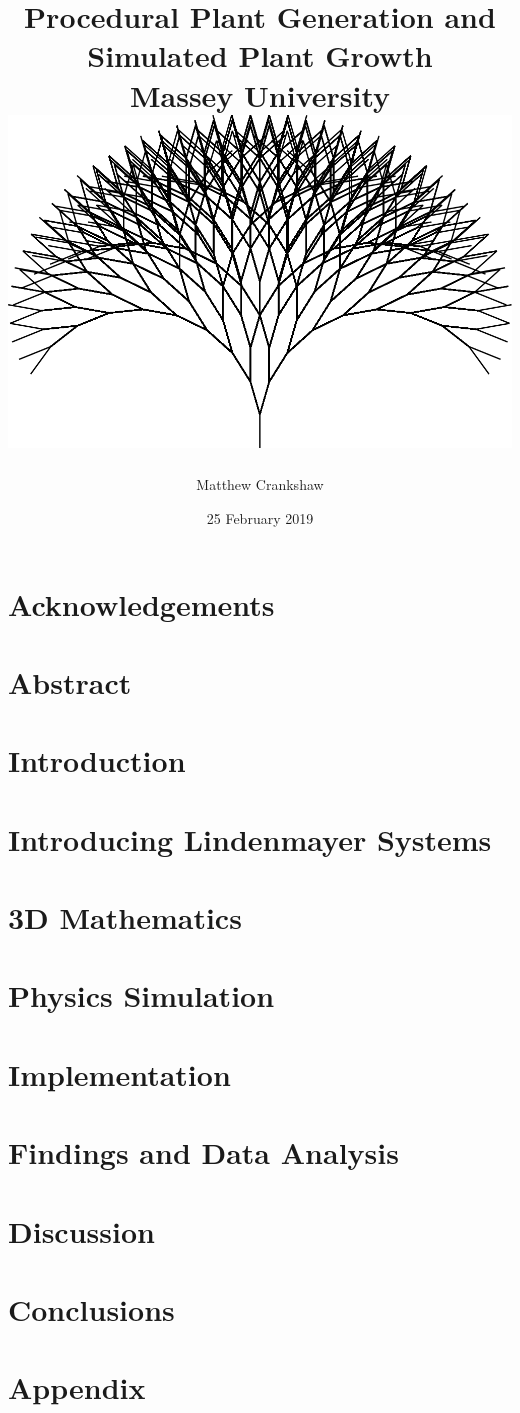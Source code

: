 \documentclass[11pt]{report}
\title{
{ Procedural Plant Generation and Simulated Plant Growth }\\
{\large Massey University}
\\
\vspace{2cm}
{\includegraphics[scale=0.35]{titlepage.png}}
\vspace{2cm}
}
\author{Matthew Crankshaw}
\date{25 February 2019}
\begin{document}
\maketitle

\chapter*{Acknowledgements}

\chapter*{Abstract}

\tableofcontents
\listoffigures


\chapter{Introduction}


\chapter{Introducing Lindenmayer Systems}   


\chapter{3D Mathematics}


\chapter{Physics Simulation}


\chapter{Implementation}


\chapter{Findings and Data Analysis}


\chapter{Discussion}


\chapter{Conclusions}


\printglossary[type=\acronymtype]
\printglossary

\appendix
\chapter{Appendix}

\end{document}
